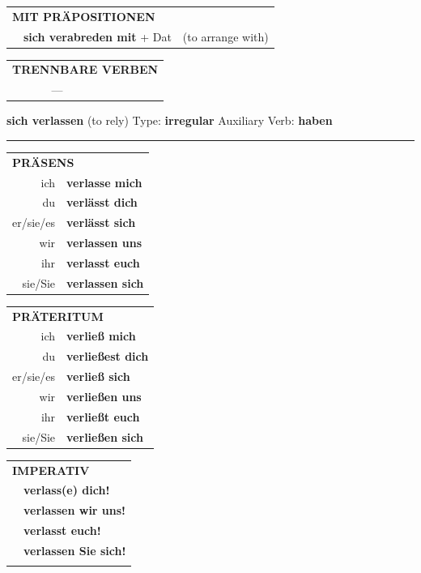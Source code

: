 \documentclass[10pt,a4paper]{revtex4-2}
\begin{document}
\begin{verbbox}
\vspace{10pt}

\begin{tabular}{lll}
\multicolumn{3}{l}{\textbf{MIT PRÄPOSITIONEN}}\\
& \textbf{sich verabreden mit} + Dat & (to arrange with)\\
\end{tabular}
\hfill
\begin{tabular}{lll}
\multicolumn{3}{l}{\textbf{TRENNBARE VERBEN}}\\
& ---\\
\end{tabular}
\vspace{-5pt}
\end{verbbox}

\begin{verbbox}
    {\Large \bf sich verlassen} (to rely) \hfill Type: \textbf{irregular} \hfill Auxiliary Verb: \textbf{haben} 
    
     \vspace{5pt}

    \hrule
    
    \vspace{5pt}

  \begin{tabular}{rl}
     \multicolumn{2}{l}{\textbf{PRÄSENS} }\\
    ich & \textbf{verlasse mich}\\
    du & \textbf{verlässt dich}\\
    er/sie/es & \textbf{verlässt sich}\\
    wir & \textbf{verlassen uns}\\
    ihr & \textbf{verlasst euch}\\
    sie/Sie & \textbf{verlassen sich}\\
  \end{tabular}
  \hfill
     \begin{tabular}{rl}
    \multicolumn{2}{l}{\textbf{PRÄTERITUM} }\\
    ich & \textbf{verließ mich}\\
    du & \textbf{verließest dich}\\
    er/sie/es & \textbf{verließ sich}\\
    wir & \textbf{verließen uns}\\
    ihr & \textbf{verließt euch}\\
    sie/Sie & \textbf{verließen sich}\\
  \end{tabular}
  \hfill
  \begin{tabular}{rl}
     \multicolumn{2}{l}{\textbf{IMPERATIV} }\\
   & \textbf{verlass(e) dich!}\\
   & \textbf{verlassen wir uns!}\\
   & \textbf{verlasst euch!}\\
   & \textbf{verlassen Sie sich!}\\
   & \vspace{10pt}
  \end{tabular}


\end{verbbox}
\end{document}
